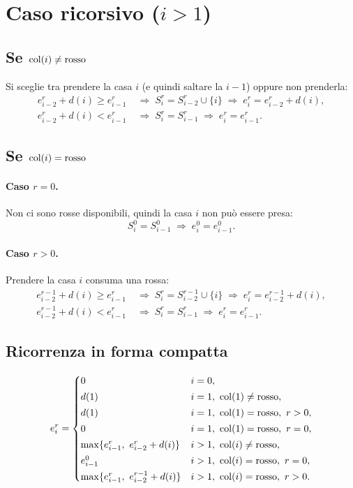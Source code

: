 \section{Caso ricorsivo ($i > 1$)}

\subsection*{Se $\mathrm{col}(i) \neq \mathrm{rosso}$}

Si sceglie tra prendere la casa $i$ (e quindi saltare la $i-1$) oppure non
prenderla:
\begin{align*}
  e_{i-2}^r + d(i) \geq e_{i-1}^r
    &\;\Longrightarrow\; S_i^r = S_{i-2}^r \cup \{i\}
     \;\Longrightarrow\; e_i^r = e_{i-2}^r + d(i),\\
  e_{i-2}^r + d(i) < e_{i-1}^r
    &\;\Longrightarrow\; S_i^r = S_{i-1}^r
     \;\Longrightarrow\; e_i^r = e_{i-1}^r.
\end{align*}

\subsection*{Se $\mathrm{col}(i) = \mathrm{rosso}$}

\paragraph{Caso $r = 0$.} Non ci sono rosse disponibili, quindi la casa $i$ non
può essere presa:
\[
  S_i^0 = S_{i-1}^0 \;\Longrightarrow\; e_i^0 = e_{i-1}^0.
\]

\paragraph{Caso $r > 0$.} Prendere la casa $i$ consuma una rossa:
\begin{align*}
  e_{i-2}^{r-1} + d(i) \geq e_{i-1}^r
    &\;\Longrightarrow\; S_i^r = S_{i-2}^{r-1} \cup \{i\}
     \;\Longrightarrow\; e_i^r = e_{i-2}^{r-1} + d(i),\\
  e_{i-2}^{r-1} + d(i) < e_{i-1}^r
    &\;\Longrightarrow\; S_i^r = S_{i-1}^r
     \;\Longrightarrow\; e_i^r = e_{i-1}^r.
\end{align*}

\subsection*{Ricorrenza in forma compatta}

\[
  e_i^r =
  \begin{cases}
    0 & i = 0,\\[2pt]
    d(1) & i = 1,\ \mathrm{col}(1) \neq \mathrm{rosso},\\[2pt]
    d(1) & i = 1,\ \mathrm{col}(1) = \mathrm{rosso},\ r > 0,\\[2pt]
    0 & i = 1,\ \mathrm{col}(1) = \mathrm{rosso},\ r = 0,\\[2pt]
    \max\{e_{i-1}^r,\ e_{i-2}^r + d(i)\} & i > 1,\ \mathrm{col}(i) \neq \mathrm{rosso},\\[2pt]
    e_{i-1}^0 & i > 1,\ \mathrm{col}(i) = \mathrm{rosso},\ r = 0,\\[2pt]
    \max\{e_{i-1}^r,\ e_{i-2}^{r-1} + d(i)\} & i > 1,\ \mathrm{col}(i) = \mathrm{rosso},\ r > 0.
  \end{cases}
\]

